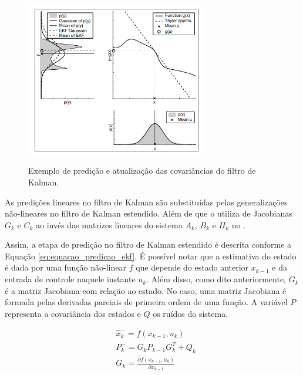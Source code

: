 \documentclass[acronym, symbols, table]{fei}
\begin{document}
			\begin{figure}[!htb]
				\centering
				\caption{Exemplo de predição e atualização das covariâncias do filtro de Kalman.}
				\includegraphics[width=0.7\textwidth]{figura_linearizacao_ekf.png}
				\label{fig:ekf_linearizacao}
			\end{figure}
			
			As predições lineares no filtro de Kalman são substituídas pelas generalizações não-lineares no filtro de Kalman estendido. Além de que o  utiliza de Jacobianas $G_k$ e $C_k$ ao invés das matrizes lineares do sistema $A_k$, $B_k$ e $H_k$ no .
			
			Assim, a etapa de predição no filtro de Kalman estendido é descrita conforme a Equação \eqref{eq:equacao_predicao_ekf}. É possível notar que a estimativa do estado é dada por uma função não-linear $f$ que depende do estado anterior $x_{k-1}$ e da entrada de controle naquele instante $u_{k}$. Além disso, como dito anteriormente, $G_{k}$ é a matriz Jacobiana com relação ao estado. No caso, uma matriz Jacobiana é formada pelas derivadas parciais de primeira ordem de uma função. A variável $P$ representa a covariância dos estados e $Q$ os ruídos do sistema.
			
			\begin{equation} \label{eq:equacao_predicao_ekf}
				\begin{split}
					&\hat{x}_{k}^{-} = f(x_{k-1}, u_{k}) \\
					&P_{k}^{-} = G_{k}P_{k-1}G_{k}^{T} + Q_{k} \\
					&G_{k} = \frac{\partial f(x_{k-1}, u_{k})}{\partial x_{k-1}} 
				\end{split}
			\end{equation}
			
\end{document}
